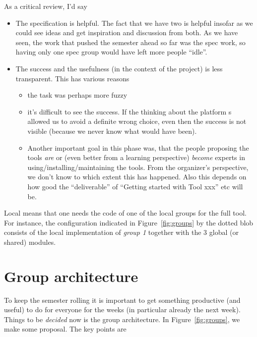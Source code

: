 \documentclass[11pt,handout]{handout}
\begin{document}
As a critical review, I'd say


\begin{itemize}
\item The specification is helpful. The fact that we have two is helpful
  insofar as we could see ideas and get inspiration and discussion from
  both. As we have seen, the work that pushed the semester ahead so far was
  the spec work, so having only one spec group would have left more people
  ``idle''.
\item The success and the usefulness (in the context of the project) is
  less transparent. This has various reasons
  \begin{itemize}
  \item the task was perhaps more fuzzy
  \item it's difficult to see the success. If the thinking about the
    platform s allowed us to avoid a definite wrong choice, even then the
    success is not visible (because we never know what would have been).
  \item Another important goal in this phase was, that the people proposing
    the tools \emph{are} or (even better from a learning perspective)
    \emph{become} experts in using/installing/maintaining the tools. From
    the organizer's perspective, we don't know to which extent this has
    happened. Also this depends on how good the ``deliverable'' of
    ``Getting started with Tool xxx'' etc will be.
  \end{itemize}
\end{itemize}

Local means that one needs the code of one of the local groups for the full
tool. For instance, the configuration indicated in Figure~\ref{fig:groups}
by the dotted blob consists of the local implementation of \emph{group 1}
together with the 3 global (or shared) modules.



\section*{Group architecture}


To keep the semester rolling it is important to get something productive
(and useful) to do for everyone for the weeks (in particular already the
next week). Things to be \emph{decided} now is the group architecture. In
Figure~\ref{fig:groups}, we make some proposal. The key points are
\end{document}
